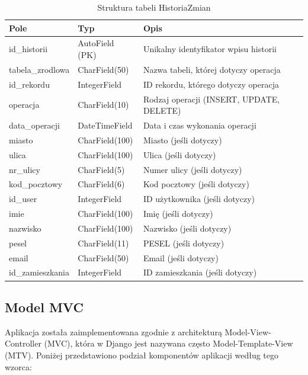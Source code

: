 \documentclass[12pt,a4paper]{article}
\begin{document}
\begin{table}[H]
\centering
\begin{tabular}{|l|l|p{7cm}|}
\hline
\textbf{Pole} & \textbf{Typ} & \textbf{Opis} \\
\hline
id\_historii & AutoField (PK) & Unikalny identyfikator wpisu historii \\
\hline
tabela\_zrodlowa & CharField(50) & Nazwa tabeli, której dotyczy operacja \\
\hline
id\_rekordu & IntegerField & ID rekordu, którego dotyczy operacja \\
\hline
operacja & CharField(10) & Rodzaj operacji (INSERT, UPDATE, DELETE) \\
\hline
data\_operacji & DateTimeField & Data i czas wykonania operacji \\
\hline
miasto & CharField(100) & Miasto (jeśli dotyczy) \\
\hline
ulica & CharField(100) & Ulica (jeśli dotyczy) \\
\hline
nr\_ulicy & CharField(5) & Numer ulicy (jeśli dotyczy) \\
\hline
kod\_pocztowy & CharField(6) & Kod pocztowy (jeśli dotyczy) \\
\hline
id\_user & IntegerField & ID użytkownika (jeśli dotyczy) \\
\hline
imie & CharField(100) & Imię (jeśli dotyczy) \\
\hline
nazwisko & CharField(100) & Nazwisko (jeśli dotyczy) \\
\hline
pesel & CharField(11) & PESEL (jeśli dotyczy) \\
\hline
email & CharField(50) & Email (jeśli dotyczy) \\
\hline
id\_zamieszkania & IntegerField & ID zamieszkania (jeśli dotyczy) \\
\hline
\end{tabular}
\caption{Struktura tabeli HistoriaZmian}
\end{table}

\newpage

\subsection{Model MVC}

Aplikacja została zaimplementowana zgodnie z architekturą Model-View-Controller (MVC), która w Django jest nazywana często Model-Template-View (MTV). Poniżej przedstawiono podział komponentów aplikacji według tego wzorca:
\end{document}
